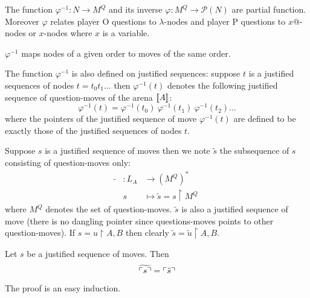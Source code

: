 The function $\varphi^{-1} : N \rightarrow M^Q$ and its inverse
$\varphi : M^Q \rightarrow \mathcal{P}(N)$ are partial function.
Moreover $\varphi$ relates player O questions to $\lambda$-nodes
and player P questions to $x @$-nodes or $x$-nodes where $x$ is a variable.

\begin{property}
\label{proper:phi_conserve_order}
$\varphi^{-1}$ maps nodes of a given order to moves of the same order.
\end{property}


The function $\varphi^{-1}$ is also defined on justified sequences: suppose $t$
is a justified sequences of nodes $t = t_0 t_1 \ldots$ then $\varphi^{-1}(t)$ denotes
the following justified sequence of question-moves of the arena ${[\![ A ]\!]}$:
$$\varphi^{-1}(t) = \varphi^{-1}(t_0)\ \varphi^{-1}(t_1)\  \varphi^{-1}(t_2) \ldots$$
where the pointers of the justified sequence of move $\varphi^{-1}(t)$ are defined to be exactly those
of the justified sequences of nodes $t$.

\begin{dfn}
Suppose $s$ is a justified sequence of moves then we note $\tilde{s}$
the subsequence of $s$ consisting of question-moves only:
\begin{eqnarray*}
\tilde{} &: L_A &\longrightarrow (M^Q)^* \\
& s &\longmapsto \tilde{s} = s \upharpoonright M^Q
\end{eqnarray*}
where $M^Q$ denotes the set of question-moves.
$\tilde{s}$ is also a justified sequence of move (there is no dangling pointer since questions-moves points to other question-moves).
If $s = u\upharpoonright A,B$ then clearly $\tilde{s} = \tilde{u} \upharpoonright A,B$.
\end{dfn}

\begin{property} Let $s$ be a justified sequence of moves. Then
\label{proper:tildepview}
$$\widetilde{\ulcorner s \urcorner} = \ulcorner \tilde{s} \urcorner$$
\end{property}
The proof is an easy induction.


